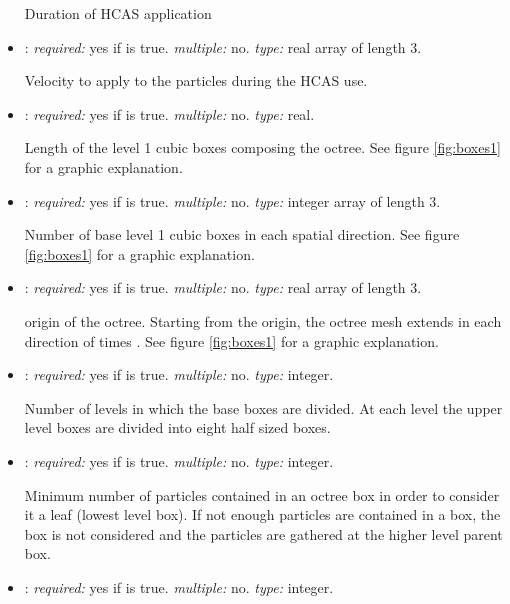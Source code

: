 \begin{itemize}
Duration of HCAS application

\item {}: \textit{required:} yes if  is true. 
\textit{multiple:} no. \textit{type:} real array of length 3.

Velocity to apply to the particles during the HCAS use. 

\item {}: \textit{required:} yes if  is true. 
\textit{multiple:} no. \textit{type:} real.

Length of the level 1 cubic boxes composing the octree. See figure 
\ref{fig:boxes1} for a graphic explanation.

\item {}: \textit{required:} yes if  is true. 
\textit{multiple:} no. \textit{type:} integer array of length 3.

Number of base level 1 cubic boxes in each spatial direction. See figure 
\ref{fig:boxes1} for a graphic explanation.

\item {}: \textit{required:} yes if  is true. 
\textit{multiple:} no. \textit{type:} real array of length 3. 

origin of the octree. Starting from the origin, the octree mesh extends in 
each direction of  times . 
See figure \ref{fig:boxes1} for a graphic explanation.

\item {}: \textit{required:} yes if  is true. 
\textit{multiple:} no. \textit{type:} integer.

Number of levels in  which the base boxes are divided. At each level 
the upper level boxes are divided into eight half sized boxes. 

\item {}: \textit{required:} yes if  is true. 
\textit{multiple:} no. \textit{type:} integer.

Minimum number of particles contained in an octree box in order to consider 
it a leaf (lowest level box). If not enough particles are contained in a 
box, the box is not considered and the particles are gathered at the higher 
level parent box.

\item {}: \textit{required:} yes if  is true. 
\textit{multiple:} no. \textit{type:} integer.


\end{itemize}

